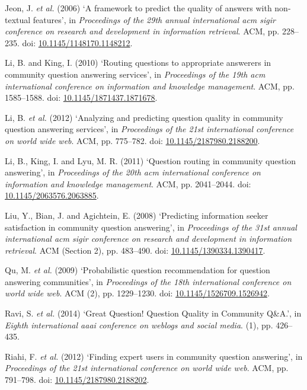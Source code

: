 \documentclass[11pt,preprint, authoryear]{article}
\numberwithin{equation}{section}
\numberwithin{figure}{section}
\begin{document}
\hypertarget{ref-Jeon2006}{}
Jeon, J. \emph{et al.} (2006) `A framework to predict the quality of
answers with non-textual features', in \emph{Proceedings of the 29th
annual international acm sigir conference on research and development in
information retrieval}. ACM, pp. 228--235. doi:
\href{https://doi.org/10.1145/1148170.1148212}{10.1145/1148170.1148212}.

\hypertarget{ref-Li2010}{}
Li, B. and King, I. (2010) `Routing questions to appropriate answerers
in community question answering services', in \emph{Proceedings of the
19th acm international conference on information and knowledge
management}. ACM, pp. 1585--1588. doi:
\href{https://doi.org/10.1145/1871437.1871678}{10.1145/1871437.1871678}.

\hypertarget{ref-Li2012}{}
Li, B. \emph{et al.} (2012) `Analyzing and predicting question quality
in community question answering services', in \emph{Proceedings of the
21st international conference on world wide web}. ACM, pp. 775--782.
doi:
\href{https://doi.org/10.1145/2187980.2188200}{10.1145/2187980.2188200}.

\hypertarget{ref-Li2011}{}
Li, B., King, I. and Lyu, M. R. (2011) `Question routing in community
question answering', in \emph{Proceedings of the 20th acm international
conference on information and knowledge management}. ACM, pp.
2041--2044. doi:
\href{https://doi.org/10.1145/2063576.2063885}{10.1145/2063576.2063885}.

\hypertarget{ref-Liu2008}{}
Liu, Y., Bian, J. and Agichtein, E. (2008) `Predicting information
seeker satisfaction in community question answering', in
\emph{Proceedings of the 31st annual international acm sigir conference
on research and development in information retrieval}. ACM (Section 2),
pp. 483--490. doi:
\href{https://doi.org/10.1145/1390334.1390417}{10.1145/1390334.1390417}.

\hypertarget{ref-Qu2009}{}
Qu, M. \emph{et al.} (2009) `Probabilistic question recommendation for
question answering communities', in \emph{Proceedings of the 18th
international conference on world wide web}. ACM (2), pp. 1229--1230.
doi:
\href{https://doi.org/10.1145/1526709.1526942}{10.1145/1526709.1526942}.

\hypertarget{ref-Ravi2014}{}
Ravi, S. \emph{et al.} (2014) `Great Question! Question Quality in
Community Q\&A.', in \emph{Eighth international aaai conference on
weblogs and social media}. (1), pp. 426--435.

\hypertarget{ref-Riahi2012}{}
Riahi, F. \emph{et al.} (2012) `Finding expert users in community
question answering', in \emph{Proceedings of the 21st international
conference on world wide web}. ACM, pp. 791--798. doi:
\href{https://doi.org/10.1145/2187980.2188202}{10.1145/2187980.2188202}.
\end{document}
